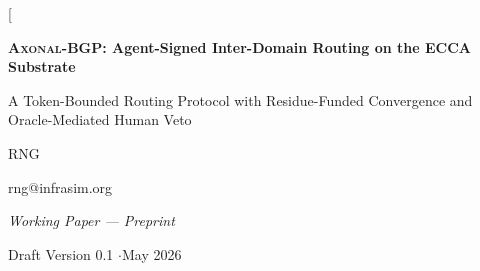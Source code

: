 \documentclass[11pt,twocolumn]{article}
\theoremstyle{definition}
\theoremstyle{plain}
\theoremstyle{remark}
\newcommand{\axonal}{\textsc{Axonal-BGP}}
\begin{document}
\twocolumn[
\begin{center}
  {\LARGE\bfseries\sffamily \axonal{}: Agent-Signed Inter-Domain Routing on the ECCA Substrate}\par\vspace{0.4em}
  {\large\sffamily A Token-Bounded Routing Protocol with Residue-Funded Convergence and Oracle-Mediated Human Veto}\par\vspace{1.5em}
  {\normalsize\sffamily RNG}\par\vspace{0.3em}
  {\small\ttfamily rng@infrasim.org}\par\vspace{1.5em}
  {\normalsize
    \textit{Working Paper --- Preprint}\par\vspace{0.3em}
    Draft Version 0.1 \quad$\cdot$\quad May 2026
  }\par\vspace{2em}
\end{center}
\end{document}
